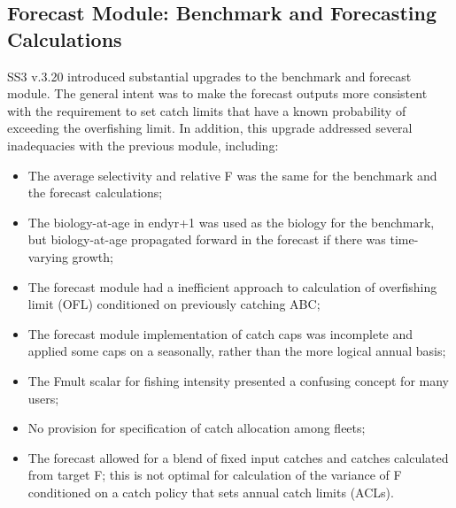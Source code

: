 \hypertarget{appendB}{}
\subsection{Forecast Module: Benchmark and Forecasting Calculations}
\label{sec:forecast}

SS3 v.3.20 introduced substantial upgrades to the benchmark and forecast module.  The general intent was to make the forecast outputs more consistent with the requirement to set catch limits that have a known probability of exceeding the overfishing limit.  In addition, this upgrade addressed several inadequacies with the previous module, including:

\begin{itemize}
	\item The average selectivity and relative F was the same for the benchmark and the forecast calculations;
	\item The biology-at-age in endyr+1 was used as the biology for the benchmark, but biology-at-age propagated forward in the forecast if there was time-varying growth;
	\item The forecast module had a inefficient approach to calculation of overfishing limit (OFL) conditioned on previously catching ABC;
	\item The forecast module implementation of catch caps was incomplete and applied some caps on a seasonally, rather than the more logical annual basis;
	\item The Fmult scalar for fishing intensity presented a confusing concept for many users;
	\item No provision for specification of catch allocation among fleets;
	\item The forecast allowed for a blend of fixed input catches and catches calculated from target F; this is not optimal for calculation of the variance of F conditioned on a catch policy that sets annual catch limits (ACLs).
\end{itemize}

